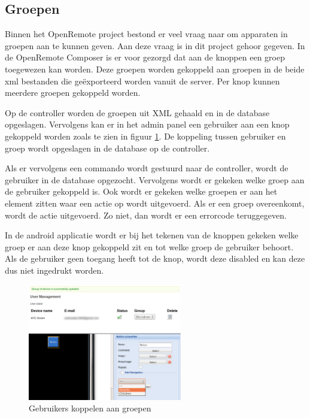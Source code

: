 \documentclass[]{article}
\begin{document}
\subsection{Groepen}
Binnen het OpenRemote project bestond er veel vraag naar om apparaten in groepen aan
te kunnen geven. Aan deze vraag is in dit project gehoor gegeven. In de
OpenRemote Composer is er voor gezorgd dat aan de knoppen een groep toegewezen
kan worden. Deze groepen worden gekoppeld aan groepen in de beide xml bestanden
die ge\"exporteerd worden vanuit de server. Per knop kunnen meerdere groepen
gekoppeld worden.

Op de controller worden de groepen uit XML gehaald en in de database opgeslagen.
Vervolgens kan er in het admin panel een gebruiker aan een knop gekoppeld
worden zoals te zien in figuur \ref{usergroups}. De koppeling tussen gebruiker
en groep wordt opgeslagen in de database op de controller. 

Als er vervolgens een commando wordt gestuurd naar de controller, wordt de
gebruiker in de database opgezocht. Vervolgens wordt er gekeken welke groep aan
de gebruiker gekoppeld is. Ook wordt er gekeken welke groepen er aan het element
zitten waar een actie op wordt uitgevoerd. Als er een groep overeenkomt, wordt
de actie uitgevoerd. Zo niet, dan wordt er een errorcode teruggegeven.

In de android applicatie wordt er bij het tekenen van de knoppen gekeken welke
groep er aan deze knop gekoppeld zit en tot welke groep de gebruiker behoort.
Als de gebruiker geen toegang heeft tot de knop, wordt deze disabled en kan deze
dus niet ingedrukt worden.

\begin{figure}[htpb]
   \begin{center}
     \includegraphics[width=0.6\textwidth]{usergroups.pdf}
   \end{center}
   \caption{Gebruikers koppelen aan groepen}
   \label{usergroups}
\end{figure}
\end{document}
